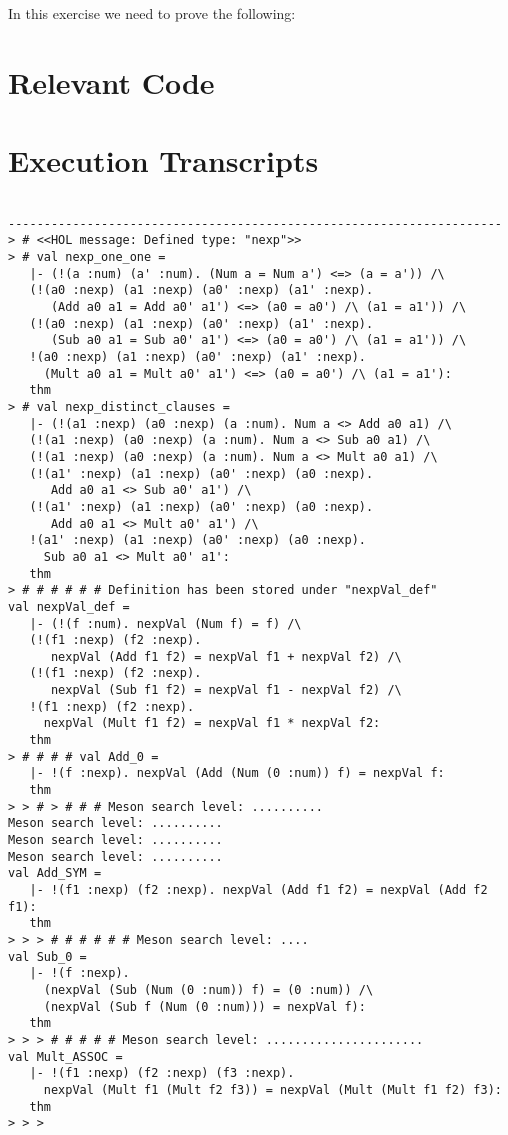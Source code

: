 \documentclass{report}
\begin{document}
In this exercise we need to prove the following:  

\HOLnexpTheoremsAddXXZero
\HOLnexpTheoremsAddXXSYM
\HOLnexpTheoremsSubXXZero
\HOLnexpTheoremsMultXXASSOC

\section{Relevant Code}
\label{sec:relevant-code-3}


\section{Execution Transcripts}
\label{sec:exec-transcr-3}

\setcounter{sessioncount}{0}
\begin{session}
  \begin{scriptsize}
\begin{verbatim}

---------------------------------------------------------------------
> # <<HOL message: Defined type: "nexp">>
> # val nexp_one_one =
   |- (!(a :num) (a' :num). (Num a = Num a') <=> (a = a')) /\
   (!(a0 :nexp) (a1 :nexp) (a0' :nexp) (a1' :nexp).
      (Add a0 a1 = Add a0' a1') <=> (a0 = a0') /\ (a1 = a1')) /\
   (!(a0 :nexp) (a1 :nexp) (a0' :nexp) (a1' :nexp).
      (Sub a0 a1 = Sub a0' a1') <=> (a0 = a0') /\ (a1 = a1')) /\
   !(a0 :nexp) (a1 :nexp) (a0' :nexp) (a1' :nexp).
     (Mult a0 a1 = Mult a0' a1') <=> (a0 = a0') /\ (a1 = a1'):
   thm
> # val nexp_distinct_clauses =
   |- (!(a1 :nexp) (a0 :nexp) (a :num). Num a <> Add a0 a1) /\
   (!(a1 :nexp) (a0 :nexp) (a :num). Num a <> Sub a0 a1) /\
   (!(a1 :nexp) (a0 :nexp) (a :num). Num a <> Mult a0 a1) /\
   (!(a1' :nexp) (a1 :nexp) (a0' :nexp) (a0 :nexp).
      Add a0 a1 <> Sub a0' a1') /\
   (!(a1' :nexp) (a1 :nexp) (a0' :nexp) (a0 :nexp).
      Add a0 a1 <> Mult a0' a1') /\
   !(a1' :nexp) (a1 :nexp) (a0' :nexp) (a0 :nexp).
     Sub a0 a1 <> Mult a0' a1':
   thm
> # # # # # # Definition has been stored under "nexpVal_def"
val nexpVal_def =
   |- (!(f :num). nexpVal (Num f) = f) /\
   (!(f1 :nexp) (f2 :nexp).
      nexpVal (Add f1 f2) = nexpVal f1 + nexpVal f2) /\
   (!(f1 :nexp) (f2 :nexp).
      nexpVal (Sub f1 f2) = nexpVal f1 - nexpVal f2) /\
   !(f1 :nexp) (f2 :nexp).
     nexpVal (Mult f1 f2) = nexpVal f1 * nexpVal f2:
   thm
> # # # # val Add_0 =
   |- !(f :nexp). nexpVal (Add (Num (0 :num)) f) = nexpVal f:
   thm
> > # > # # # Meson search level: ..........
Meson search level: ..........
Meson search level: ..........
Meson search level: ..........
val Add_SYM =
   |- !(f1 :nexp) (f2 :nexp). nexpVal (Add f1 f2) = nexpVal (Add f2 f1):
   thm
> > > # # # # # # Meson search level: ....
val Sub_0 =
   |- !(f :nexp).
     (nexpVal (Sub (Num (0 :num)) f) = (0 :num)) /\
     (nexpVal (Sub f (Num (0 :num))) = nexpVal f):
   thm
> > > # # # # # Meson search level: ......................
val Mult_ASSOC =
   |- !(f1 :nexp) (f2 :nexp) (f3 :nexp).
     nexpVal (Mult f1 (Mult f2 f3)) = nexpVal (Mult (Mult f1 f2) f3):
   thm
> > > 

\end{verbatim}
  \end{scriptsize}
\end{session}
\end{document}
